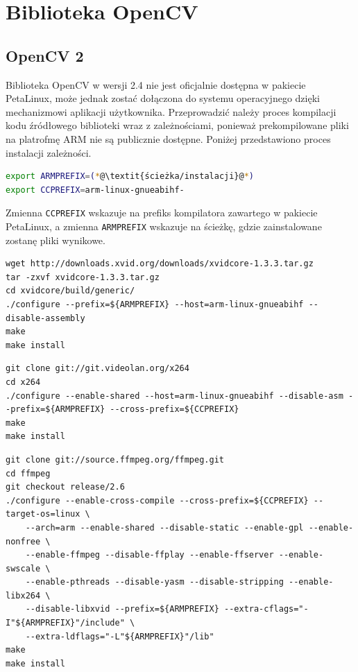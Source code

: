 \section{Biblioteka OpenCV}
\label{sec:opencv-config}
\subsection{OpenCV 2}
Biblioteka OpenCV w wersji 2.4 nie jest oficjalnie dostępna w pakiecie PetaLinux, może jednak zostać dołączona do systemu operacyjnego dzięki mechanizmowi aplikacji użytkownika.
Przeprowadzić należy proces kompilacji kodu źródłowego biblioteki wraz z zależnościami, ponieważ prekompilowane pliki na platrofmę ARM nie są publicznie dostępne. Poniżej przedstawiono proces instalacji zależności.%

\begin{lstlisting}[breaklines=true, language=Bash, caption=Definicja zmiennych środowiskowych.]
export ARMPREFIX=(*@\textit{ścieżka/instalacji}@*)
export CCPREFIX=arm-linux-gnueabihf-
\end{lstlisting}

Zmienna \texttt{CCPREFIX} wskazuje na prefiks kompilatora zawartego w pakiecie PetaLinux, a zmienna \texttt{ARMPREFIX} wskazuje na ścieżkę, gdzie zainstalowane zostanę pliki wynikowe.

\begin{lstlisting}[breaklines=true, caption=Kompilacja biblioteki \textit{xVideo}.]
wget http://downloads.xvid.org/downloads/xvidcore-1.3.3.tar.gz
tar -zxvf xvidcore-1.3.3.tar.gz
cd xvidcore/build/generic/
./configure --prefix=${ARMPREFIX} --host=arm-linux-gnueabihf --disable-assembly
make
make install
\end{lstlisting}

\begin{lstlisting}[breaklines=true, caption=Kompilacja biblioteki \textit{x264}.]
git clone git://git.videolan.org/x264
cd x264
./configure --enable-shared --host=arm-linux-gnueabihf --disable-asm --prefix=${ARMPREFIX} --cross-prefix=${CCPREFIX}
make
make install
\end{lstlisting}

\begin{lstlisting}[breaklines=true, caption=Kompilacja biblioteki \textit{ffmpeg}.]
git clone git://source.ffmpeg.org/ffmpeg.git
cd ffmpeg
git checkout release/2.6
./configure --enable-cross-compile --cross-prefix=${CCPREFIX} --target-os=linux \
	--arch=arm --enable-shared --disable-static --enable-gpl --enable-nonfree \
	--enable-ffmpeg --disable-ffplay --enable-ffserver --enable-swscale \
	--enable-pthreads --disable-yasm --disable-stripping --enable-libx264 \
	--disable-libxvid --prefix=${ARMPREFIX} --extra-cflags="-I"${ARMPREFIX}"/include" \
	--extra-ldflags="-L"${ARMPREFIX}"/lib"
make
make install
\end{lstlisting}

